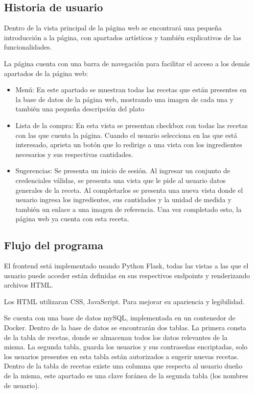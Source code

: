 \documentclass[a4paper,11pt]{article}
\begin{document}
\subsection*{Historia de usuario}
Dentro de la vista principal de la página web se encontrará una pequeña introducción a la página, con apartados artísticos y también explicativos de las funcionalidades.

La página cuenta con una barra de navegación para facilitar el acceso a los demás apartados de la página web:
\begin{itemize}
    \item Menú: En este apartado se muestran todas las recetas que están presentes en la base de datos de la página web, mostrando una imagen de cada una y también una pequeña descripción del plato
    \item Lista de la compra: En esta vista se presentan checkbox con todas las recetas con las que cuenta la página. Cuando el usuario selecciona en las que está interesado, aprieta un botón que lo redirige a una vista con los ingredientes necesarios y sus respectivas cantidades.
    \item Sugerencias: Se presenta un inicio de sesión. Al ingresar un conjunto de credenciales válidas, se presenta una vista que le pide al usuario datos generales de la receta. Al completarlos se presenta una nueva vista donde el usuario ingresa los ingredientes, sus cantidades y la unidad de medida y también un enlace a una imagen de referencia. Una vez completado esto, la página web ya cuenta con esta receta.
\end{itemize}
\subsection*{Flujo del programa}
El frontend está implementado usando Python Flask, todas las vistas a las que el usuario puede acceder están definidas en sus respectivos endpoints y renderizando archivos HTML.

Los HTML utilizaran CSS, JavaScript. Para mejorar su apariencia y legibilidad.

Se cuenta con una base de datos mySQL, implementada en un contenedor de Docker. Dentro de la base de datos se encontrarán dos tablas. La primera consta de la tabla de recetas, donde se almacenan todos los  datos relevantes de la misma. La segunda tabla, guarda los usuarios y sus contraseñas encriptadas, solo los usuarios presentes en esta tabla están autorizados a sugerir nuevas recetas. Dentro de la tabla de recetas existe una columna que respecta al usuario dueño de la misma, este apartado es una clave foránea de la segunda tabla (los nombres de usuario).
\end{document}
